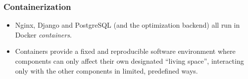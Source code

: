 \documentclass{beamer}
\begin{document}
\begin{frame}
  \frametitle{Containerization}

  \begin{itemize}
  \item Nginx, Django and PostgreSQL (and the optimization backend)
    all run in Docker \emph{containers}.
  \item Containers provide a fixed and reproducible software
    environment where components can only affect their own designated
    ``living space'', interacting only with the other components in
    limited, predefined ways.
  \end{itemize}
\end{frame}
\end{document}
